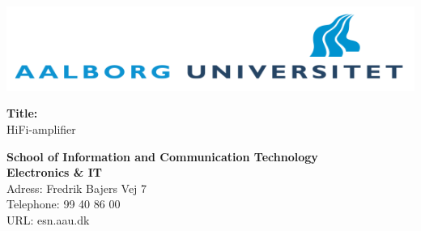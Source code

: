 \begin{multicols}{2}
\includegraphics[scale=0.35]{forside/aau.png}

\small{\textbf{Title:\\}
HiFi-amplifier}

\scriptsize{\textbf{School of Information and Communication Technology\\ Electronics \& IT\\}
Adress: Fredrik Bajers Vej 7\\
Telephone: 99 40 86 00\\
URL: esn.aau.dk \\}
\end{multicols}
